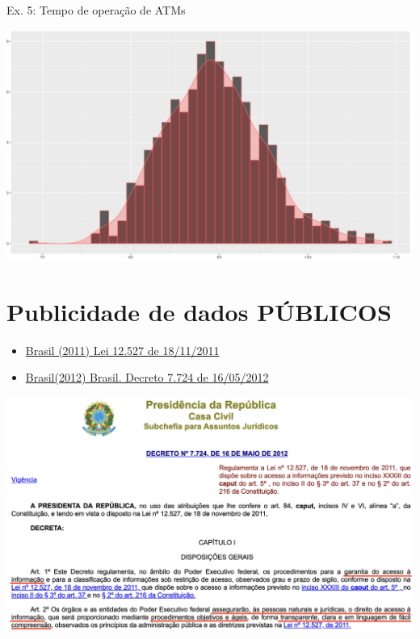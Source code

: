 \documentclass{beamer}\usepackage[]{graphicx}\usepackage[]{xcolor}
\begin{document}
\begin{frame}{Ex. 5: Tempo de operação de ATMs}
	\begin{center}
    \includegraphics[scale=0.25]{horasOp.png}
  \end{center}
\end{frame}


\section{Publicidade de dados PÚBLICOS}
\begin{frame}{\secname}
  \begin{itemize}
    \item \href{http://www.planalto.gov.br/ccivil_03/_ato2011-2014/2011/lei/l12527.htm}{Brasil (2011) Lei 12.527 de 18/11/2011}
    \item \href{http://www.planalto.gov.br/ccivil_03/_ato2011-2014/2012/Decreto/D7724.htm}{Brasil(2012) Brasil. Decreto 7.724 de 16/05/2012}
	\end{itemize}
	\begin{center}
  \includegraphics[scale=0.3]{lai12.png}
  \end{center}
\end{frame}
\end{document}
